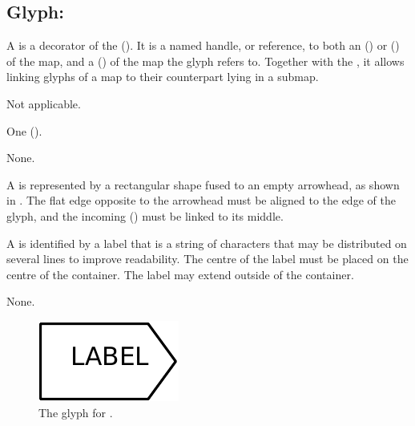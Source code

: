 \subsection{Glyph: }
\label{sec:submapTerminal}

A  is a decorator of the  ().
It is a named handle, or reference, to both an  () or  () of the map, and a  () of the map the  glyph refers to.
Together with the , it allows linking glyphs of a map to their counterpart lying in a submap.

\begin{glyphDescription}

\glyphSboTerm Not applicable.

\glyphIncoming
One  ().

\glyphOutgoing
None.

\glyphContainer A  is represented by a rectangular shape fused to an empty arrowhead, as shown in .
The flat edge opposite to the arrowhead must be aligned to the edge of the  glyph, and the incoming  () must be linked to its middle.

\glyphLabel A  is identified by a label that is  a string of characters that may be distributed on several lines to improve readability.
The centre of the label must be placed on the centre of the container.
The label may extend outside of the container.

\glyphAux
None.

\end{glyphDescription}

\begin{figure}[H]
  \centering
  \includegraphics{images/build/submap_terminal.pdf}
  \caption{The \PD glyph for .}
  \label{fig:submapTerminal}
\end{figure}
